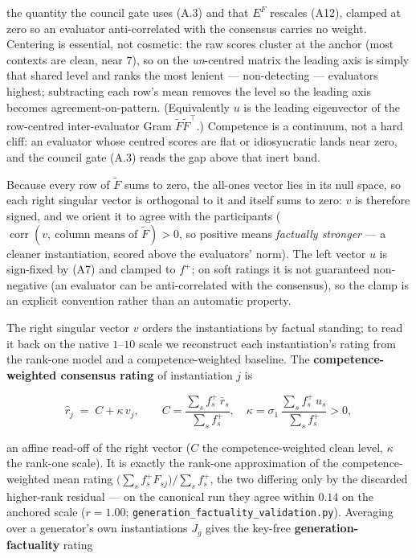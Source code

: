 the quantity the council gate uses (A.3) and that \(E^{F}\) rescales (A12), clamped at zero so an evaluator anti-correlated with the consensus carries no weight. Centering is essential, not cosmetic: the raw scores cluster at the anchor (most contexts are clean, near \(7\)), so on the \emph{un}-centred matrix the leading axis is simply that shared level and ranks the most lenient --- non-detecting --- evaluators highest; subtracting each row's mean removes the level so the leading axis becomes agreement-on-pattern. (Equivalently \(u\) is the leading eigenvector of the row-centred inter-evaluator Gram \(\tilde F\tilde F^{\top}\).) Competence is a continuum, not a hard cliff: an evaluator whose centred scores are flat or idiosyncratic lands near zero, and the council gate (A.3) reads the gap above that inert band.

Because every row of \(\tilde F\) sums to zero, the all-ones vector lies in its null space, so each right singular vector is orthogonal to it and itself sums to zero: \(v\) is therefore signed, and we orient it to agree with the participants (\(\operatorname{corr}(v,\ \text{column means of }\tilde F)>0\), so positive means \emph{factually stronger} --- a cleaner instantiation, scored above the evaluators' norm). The left vector \(u\) is sign-fixed by (A7) and clamped to \(f^{+}\); on soft ratings it is not guaranteed non-negative (an evaluator can be anti-correlated with the consensus), so the clamp is an explicit convention rather than an automatic property.

The right singular vector \(v\) orders the instantiations by factual standing; to read it back on the native \(1\)--\(10\) scale we reconstruct each instantiation's rating from the rank-one model and a competence-weighted baseline. The \textbf{competence-weighted consensus rating} of instantiation \(j\) is

\[ \hat r_j \;=\; C+\kappa\,v_j,\qquad C=\frac{\sum_s f^{+}_s\,\bar r_s}{\sum_s f^{+}_s},\quad \kappa=\sigma_1\,\frac{\sum_s f^{+}_s\,u_s}{\sum_s f^{+}_s}>0, \tag{A8}\]

an affine read-off of the right vector (\(C\) the competence-weighted clean level, \(\kappa\) the rank-one scale). It is exactly the rank-one approximation of the competence-weighted mean rating \(\big(\sum_s f^{+}_s F_{sj}\big)/\sum_s f^{+}_s\), the two differing only by the discarded higher-rank residual --- on the canonical run they agree within \(0.14\) on the anchored scale (\(r = 1.00\); \texttt{generation\_factuality\_validation.py}). Averaging over a generator's own instantiations \(J_g\) gives the key-free \textbf{generation-factuality} rating

